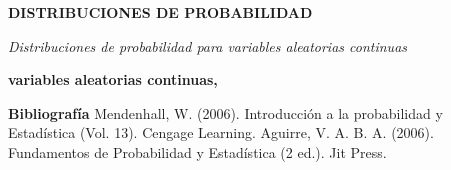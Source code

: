 \documentclass{../oxmathproblems}
\begin{document}
\begin{questions}
\textbf{DISTRIBUCIONES DE PROBABILIDAD}

\emph{ Distribuciones de probabilidad para variables aleatorias continuas}


  \textbf{variables aleatorias continuas, }  











\end{questions}




\textbf{Bibliografía}
Mendenhall, W. (2006). Introducción a la probabilidad y Estadística (Vol. 13). Cengage Learning.
Aguirre, V. A. B. A. (2006). Fundamentos de Probabilidad y Estadística (2 ed.). Jit Press.
\end{document}
